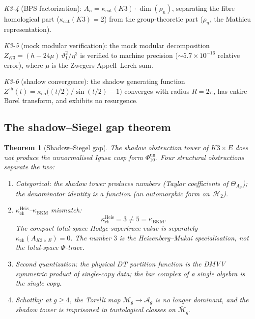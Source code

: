 \documentclass[11pt]{article}
\theoremstyle{plain}
\newtheorem{theorem}{Theorem}[section]
\theoremstyle{definition}
\theoremstyle{remark}
\newcommand{\Mbar}{\overline{\mathcal{M}}}
\newcommand{\cA}{\mathcal{A}}
\newcommand{\cC}{\mathcal{C}}
\newcommand{\cH}{\mathcal{H}}
\newcommand{\cM}{\mathcal{M}}
\begin{document}
\emph{K3-4} (BPS factorization):
$A_n = \kappa_{\mathrm{cat}}(K3) \cdot \dim(\rho_n)$, separating the
fibre homological part ($\kappa_{\mathrm{cat}}(K3) = 2$) from the
group-theoretic part ($\rho_n$, the Mathieu representation).

\emph{K3-5} (mock modular verification): the mock modular
decomposition
$Z_{K3} = (h - 24\mu)\,\vartheta_1^2/\eta^3$ is verified to
machine precision ($\sim 5.7 \times 10^{-16}$ relative error),
where $\mu$ is the Zwegers Appell--Lerch sum.

\emph{K3-6} (shadow convergence): the shadow generating function
$Z^{\mathrm{sh}}(t) = \kappa_{\mathrm{ch}}\bigl((t/2)/
\sin(t/2) - 1\bigr)$ converges with radius $R = 2\pi$, has entire
Borel transform, and exhibits no resurgence.

\subsection{The shadow--Siegel gap theorem}

\begin{theorem}[Shadow--Siegel gap]
\label{thm:v3-st-shadow-siegel-gap}
The shadow obstruction tower of $K3 \times E$ does not produce the
unnormalised Igusa cusp form $\Phi_{10}^{\mathrm{un}}$.  Four
structural obstructions
separate the two:
\begin{enumerate}[label=\textup{(O\arabic*)}]
 \item \emph{Categorical}: the shadow tower produces numbers
 (Taylor coefficients of $\Theta_{A_\cC}$); the denominator
 identity is a function (an automorphic form on~$\cH_2$).
 \item \emph{$\kappa_{\mathrm{ch}}^{\mathrm{Heis}}$--$\kappa_{\mathrm{BKM}}$
 mismatch}:
 \[
  \kappa_{\mathrm{ch}}^{\mathrm{Heis}}=3\neq 5=\kappa_{\mathrm{BKM}}.
 \]
 The compact total-space Hodge-supertrace value is separately
 $\kappa_{\mathrm{ch}}(A_{K3\times E})=0$.  The number $3$ is the
 Heisenberg--Mukai specialisation, not the total-space $\Phi$-trace.
 \item \emph{Second quantization}: the physical DT partition
 function is the DMVV symmetric product of single-copy data; the
 bar complex of a single algebra is the single copy.
 \item \emph{Schottky}: at $g \geq 4$, the Torelli map
 $\cM_g \to \cA_g$ is no longer dominant, and the shadow tower
 is imprisoned in tautological classes on $\Mbar_g$.
\end{enumerate}
\end{theorem}
\end{document}
